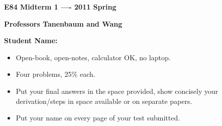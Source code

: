 \usepackage{html}


\begin{center}
{\Large \bf E84 Midterm 1 ---- 2011 Spring}

{\large \bf Professors Tanenbaum and Wang}

{\large \bf Student Name:}

\end{center}



\begin{itemize} 
\item Open-book, open-notes, calculator OK, no laptop.
\item Four problems, 25\% each.
\item Put your final answers in the space provided, show concisely your derivation/steps
  in space available or on separate papers.
\item Put your name on every page of your test submitted.
\end{itemize} 


